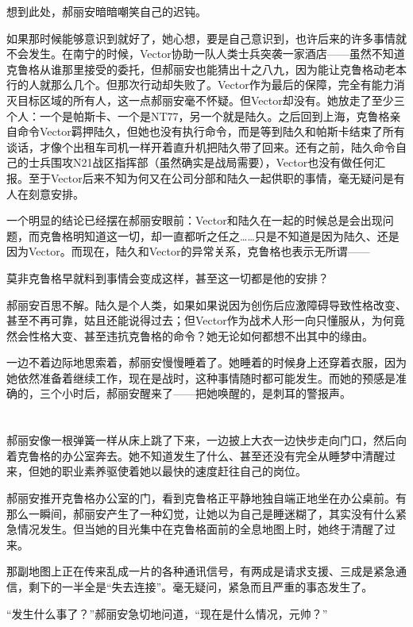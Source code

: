 想到此处，郝丽安暗暗嘲笑自己的迟钝。

如果那时候能够意识到就好了，她心想，要是自己意识到，也许后来的许多事情就不会发生。在南宁的时候，Vector协助一队人类士兵突袭一家酒店——虽然不知道克鲁格从谁那里接受的委托，但郝丽安也能猜出十之八九，因为能让克鲁格动老本行的人就那么几个。但那次行动却失败了。Vector作为最后的保障，完全有能力消灭目标区域的所有人，这一点郝丽安毫不怀疑。但Vector却没有。她放走了至少三个人：一个是帕斯卡、一个是NT77，另一个就是陆久。之后回到上海，克鲁格亲自命令Vector羁押陆久，但她也没有执行命令，而是等到陆久和帕斯卡结束了所有谈话，才像个出租车司机一样开着直升机把陆久带了回来。还有之前，陆久命令自己的士兵围攻N21战区指挥部（虽然确实是战局需要），Vector也没有做任何汇报。至于Vector后来不知为何又在公司分部和陆久一起供职的事情，毫无疑问是有人在刻意安排。

一个明显的结论已经摆在郝丽安眼前：Vector和陆久在一起的时候总是会出现问题，而克鲁格明知道这一切，却一直都听之任之……只是不知道是因为陆久、还是因为Vector。而现在，陆久和Vector的异常关系，克鲁格也表示无所谓——

莫非克鲁格早就料到事情会变成这样，甚至这一切都是他的安排？

郝丽安百思不解。陆久是个人类，如果如果说因为创伤后应激障碍导致性格改变、甚至不再可靠，姑且还能说得过去；但Vector作为战术人形一向只懂服从，为何竟然会性格大变、甚至违抗克鲁格的命令？她无论如何都想不出其中的缘由。

一边不着边际地思索着，郝丽安慢慢睡着了。她睡着的时候身上还穿着衣服，因为她依然准备着继续工作，现在是战时，这种事情随时都可能发生。而她的预感是准确的，三个小时后，郝丽安醒来了——把她唤醒的，是刺耳的警报声。 

\section*{}

郝丽安像一根弹簧一样从床上跳了下来，一边披上大衣一边快步走向门口，然后向着克鲁格的办公室奔去。她不知道发生了什么、甚至还没有完全从睡梦中清醒过来，但她的职业素养驱使着她以最快的速度赶往自己的岗位。

郝丽安推开克鲁格办公室的门，看到克鲁格正平静地独自端正地坐在办公桌前。有那么一瞬间，郝丽安产生了一种幻觉，让她以为自己是睡迷糊了，其实没有什么紧急情况发生。但当她的目光集中在克鲁格面前的全息地图上时，她终于清醒了过来。

那副地图上正在传来乱成一片的各种通讯信号，有两成是请求支援、三成是紧急通信，剩下的一半全是“失去连接”。毫无疑问，紧急而且严重的事态发生了。

“发生什么事了？”郝丽安急切地问道，“现在是什么情况，元帅？”

